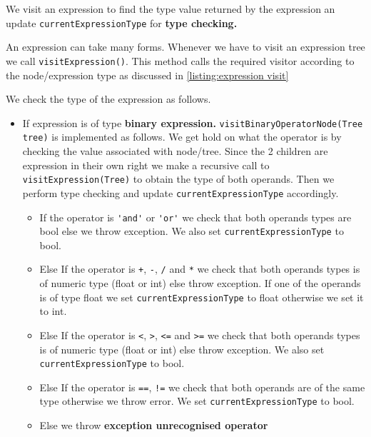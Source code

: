We visit an expression to find the  type value returned by the expression an update \verb!currentExpressionType! for \textbf{type checking.}

An expression can take many forms. Whenever we have to visit an expression tree we call  \verb!visitExpression()!. This method calls the required visitor according to the node/expression type as discussed in \ref{listing:expression visit}

We check the type of the expression as follows.
\begin{itemize}
	\item If expression is of type \textbf{binary expression.}
	      \verb!visitBinaryOperatorNode(Tree tree)! is implemented as follows. We get hold on what the operator is by checking the value associated with node/tree. Since the 2 children are expression in their own right we make a recursive call to \verb!visitExpression(Tree)! to obtain the type of both operands. Then we perform type checking and update \verb!currentExpressionType! accordingly.
	      \begin{itemize}
	      	\item If the operator is \verb!'and'! or \verb!'or'! we check that both operands types are bool else we throw exception. We  also set  \verb!currentExpressionType! to bool. 
	      	\item Else If the operator is \verb!+!, \verb!-!, \verb!/! and \verb!*!  we check that both operands types is of numeric type (float or int) else  throw exception. If one of the operands is of type float we set \verb!currentExpressionType! to float otherwise we set it to int.
	      	\item Else If the operator is \verb!<!, \verb!>!, \verb!<=! and \verb!>=!  we check that both operands types is of numeric type (float or int) else  throw exception. We also set \verb!currentExpressionType! to bool.
	      	\item Else If the operator is \verb!==!, \verb|!=| we check that both operands are of the same type otherwise we throw error. We set \verb!currentExpressionType! to bool. 
	      	\item Else we throw \textbf{exception unrecognised operator}
	      \end{itemize}
	      	      	        

\end{itemize}
